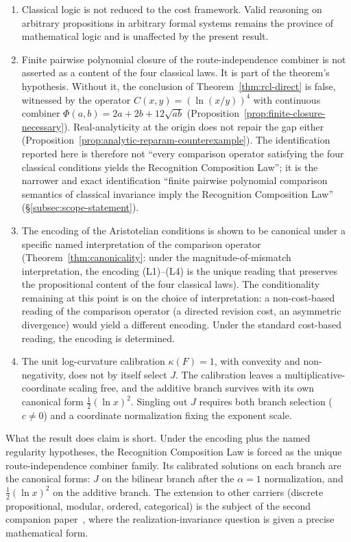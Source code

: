 \documentclass[11pt,a4paper]{article}
\theoremstyle{definition}
\theoremstyle{remark}
\begin{document}
\begin{enumerate}[label=\arabic*., leftmargin=*]
\item Classical logic is not reduced to the cost framework. Valid
reasoning on arbitrary propositions in arbitrary formal systems
remains the province of mathematical logic and is unaffected by the
present result.
\item Finite pairwise polynomial closure of the route-independence
combiner is not asserted as a content of the four classical laws. It
is part of the theorem's hypothesis. Without it, the conclusion of
Theorem~\ref{thm:rcl-direct} is false, witnessed by the operator
$C(x, y) = (\ln(x/y))^4$ with continuous combiner
$\Phi(a, b) = 2a + 2b + 12\sqrt{ab}$
(Proposition~\ref{prop:finite-closure-necessary}). Real-analyticity at
the origin does not repair the gap either
(Proposition~\ref{prop:analytic-reparam-counterexample}). The
identification reported here is therefore not ``every comparison
operator satisfying the four classical conditions yields the
Recognition Composition Law''; it is the narrower and exact
identification ``finite pairwise polynomial comparison semantics of
classical invariance imply the Recognition Composition Law''
(\S\ref{subsec:scope-statement}).
\item The encoding of the Aristotelian conditions is shown to be
canonical under a specific named interpretation of the comparison
operator (Theorem~\ref{thm:canonicality}: under the
magnitude-of-mismatch interpretation, the encoding (L1)--(L4) is the
unique reading that preserves the propositional content of the four
classical laws). The conditionality remaining at this point is on the
choice of interpretation: a non-cost-based reading of the comparison
operator (a directed revision cost, an asymmetric divergence) would
yield a different encoding. Under the standard cost-based reading,
the encoding is determined.
\item The unit log-curvature calibration $\kappa(F) = 1$, with
convexity and non-negativity, does not by itself select $J$. The
calibration leaves a multiplicative-coordinate scaling free, and the
additive branch survives with its own canonical form
$\tfrac{1}{2}(\ln x)^2$. Singling out $J$ requires both branch
selection ($c \neq 0$) and a coordinate normalization fixing the
exponent scale.
\end{enumerate}

What the result does claim is short. Under the encoding plus the
named regularity hypotheses, the Recognition Composition Law is
forced as the unique route-independence combiner family. Its
calibrated solutions on each branch are the canonical forms: $J$ on
the bilinear branch after the $\alpha = 1$ normalization, and
$\tfrac{1}{2}(\ln x)^2$ on the additive branch. The extension to
other carriers (discrete propositional, modular, ordered, categorical)
is the subject of the second companion
paper~\cite{Washburn2026UniversalForcing}, where the
realization-invariance question is given a precise mathematical form.
\end{document}
